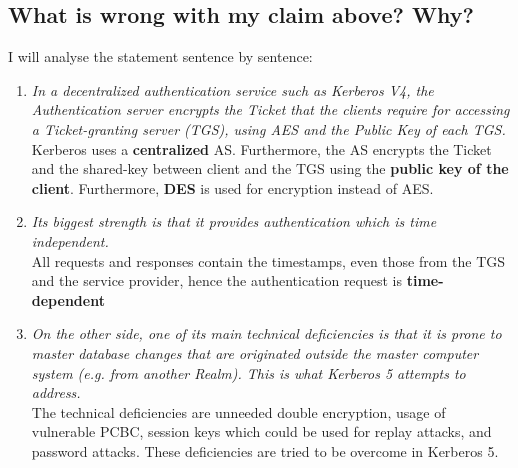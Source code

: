 \documentclass{report}
\begin{document}
		\subsection{What is wrong with my claim above? Why?}
		\startsubsection
			I will analyse the statement sentence by sentence:
			\begin{enumerate}[-]
				\item \textit{In a decentralized authentication service such as Kerberos V4, the Authentication server encrypts the Ticket that the clients require for accessing a Ticket-granting server (TGS), using AES and the Public Key of each TGS.} \\
				Kerberos uses a \textbf{centralized} AS. Furthermore, the AS encrypts the Ticket and the shared-key between client and the TGS using the \textbf{public key of the client}. Furthermore, \textbf{DES} is used for encryption instead of AES.
				\item \textit{Its biggest strength is that it provides authentication which is time independent.} \\
				All requests and responses contain the timestamps, even those from the TGS and the service provider, hence the authentication request is \textbf{time-dependent}
				\item \textit{On the other side, one of its main technical deficiencies is that it is prone to master database changes that are originated outside the master computer system (e.g. from another Realm). This is what Kerberos 5 attempts to address.} \\
				The technical deficiencies are unneeded double encryption, usage of vulnerable PCBC, session keys which could be used for replay attacks, and password attacks. These deficiencies are tried to be overcome in Kerberos 5.
			\end{enumerate}
		\closesection
	\closesection
\end{document}
